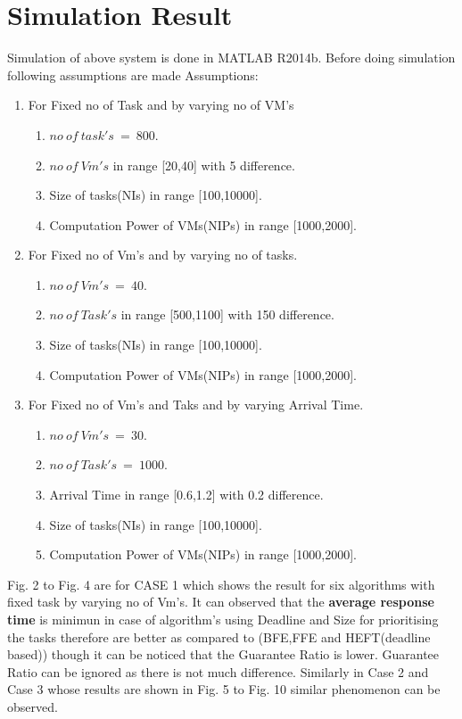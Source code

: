 \documentclass[conference]{IEEEtran}
\begin{document}
\section{Simulation Result}

Simulation of above system is done in MATLAB R2014b.
Before doing simulation following assumptions are made
Assumptions:
\begin{enumerate}
\item For Fixed no of Task and by varying no of VM's
	\begin{enumerate}
	\item $no~of~task's~=~800$.
	\item $no~of~Vm's$ in range [20,40] with 5 difference.
	\item Size of tasks(NIs) in range [100,10000].
	\item Computation Power of VMs(NIPs) in range [1000,2000].
	\end{enumerate}
\item For Fixed no of Vm's and by varying no of tasks.
	\begin{enumerate}
	\item $no~of~Vm's~=~40$.
	\item $no~of~Task's$ in range [500,1100] with 150 difference.
	\item Size of tasks(NIs) in range [100,10000].
	\item Computation Power of VMs(NIPs) in range [1000,2000].
	\end{enumerate}
\item For Fixed no of Vm's and Taks and by varying Arrival Time.
	\begin{enumerate}
	\item $no~of~Vm's~=~30$.
	\item $no~of~Task's~=~1000$.
	\item Arrival Time in range [0.6,1.2] with 0.2 difference.
	\item Size of tasks(NIs) in range [100,10000].
	\item Computation Power of VMs(NIPs) in range [1000,2000].
	\end{enumerate}
\end{enumerate}
 
Fig. 2 to Fig. 4 are for CASE 1 which shows the result for six algorithms with fixed task by varying no of Vm's. It can observed that the \textbf{average response time} is minimun in case of algorithm's using Deadline and Size for prioritising the tasks therefore are better as compared to (BFE,FFE and HEFT(deadline based)) though it can be noticed that the Guarantee  Ratio is lower. Guarantee Ratio can be ignored as there is not much difference. Similarly in Case 2 and Case 3 whose results are shown in Fig. 5 to Fig. 10 similar phenomenon can be observed.
\end{document}
